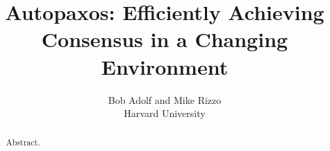 \documentclass[pageno]{jpaper}
\title{Autopaxos: Efficiently Achieving Consensus in a Changing Environment}
\author{Bob Adolf and Mike Rizzo\\Harvard University}
\date{}
\begin{document}
\maketitle

\begin{abstract}
Abstract.
\end{abstract}










\end{document}
